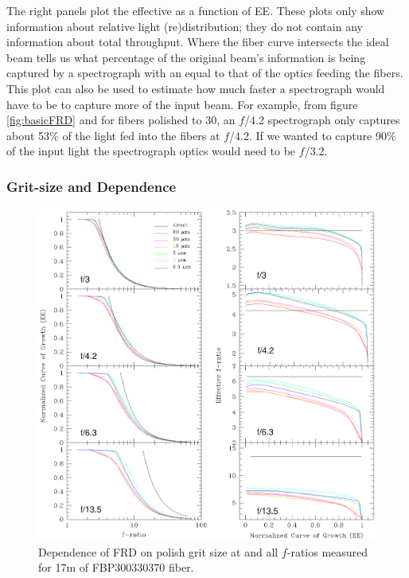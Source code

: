 The right panels plot the effective \fratio as a function of
EE. These plots only show information about relative light
(re)distribution; they do not contain any information about total
throughput.  Where the fiber curve intersects the ideal beam tells us
what percentage of the original beam's information is being captured
by a spectrograph with an \fratio equal to that of the optics feeding
the fibers. This plot can also be used to estimate how much faster a
spectrograph would have to be to capture more of the input beam. For
example, from figure \ref{fig:basicFRD} and for fibers polished to 30\mum, an $f$/4.2
spectrograph only captures about 53\% of the light fed into the fibers 
at $f$/4.2. If we wanted to capture 90\% of the input light the
spectrograph optics would need to be $f$/3.2.

\subsubsection{Grit-size and \fratio Dependence}
\label{FRD:sec:gritwave}
\begin{figure}[htp]
  \centering
  \includegraphics[width=\textwidth]{FRD/figs/gritplot.eps}
  \caption[Dependence of FRD on polish
    level]{\fixspacing\label{fig:grit}Dependence of FRD on polish grit size at
    \filty and all $f$-ratios measured for 17m of FBP300330370 fiber.}
\end{figure}

